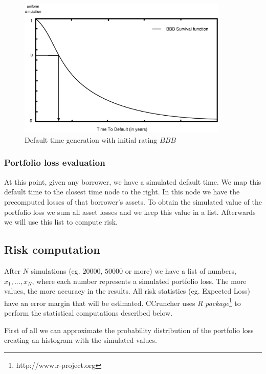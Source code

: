 \documentclass[a4paper,12pt,final]{article}
\begin{document}
\begin{figure}[!hbt]
\begin{center}
\includegraphics[width=10cm,angle=0]{./images/simttd.eps}
\caption{Default time generation with initial rating $BBB$}
\label{simttd}
\end{center}
\end{figure}
\FloatBarrier

\subsubsection{Portfolio loss evaluation}
At this point, given any borrower, we have a simulated default time. We map
this default time to the closest time node to the right. In this node we have 
the precomputed losses of that borrower's assets. To obtain the simulated 
value of the portfolio loss we sum all asset losses and we keep this value 
in a list. Afterwards we will use this list to compute risk.

\subsection{Risk computation}
After $N$ simulations (eg. $20000$, $50000$ or more) we have a list
of numbers, ${x_1, ..., x_N}$, where each number represents a simulated portfolio 
loss. The more values, the more accuracy in the results. All risk statistics (eg. 
Expected Loss) have an error margin that will be estimated. CCruncher uses 
\emph{R package}\footnote{http://www.r-project.org} to perform the statistical
computations described below.
\newline

First of all we can approximate the probability distribution of the portfolio 
loss creating an histogram with the simulated values.
\end{document}
